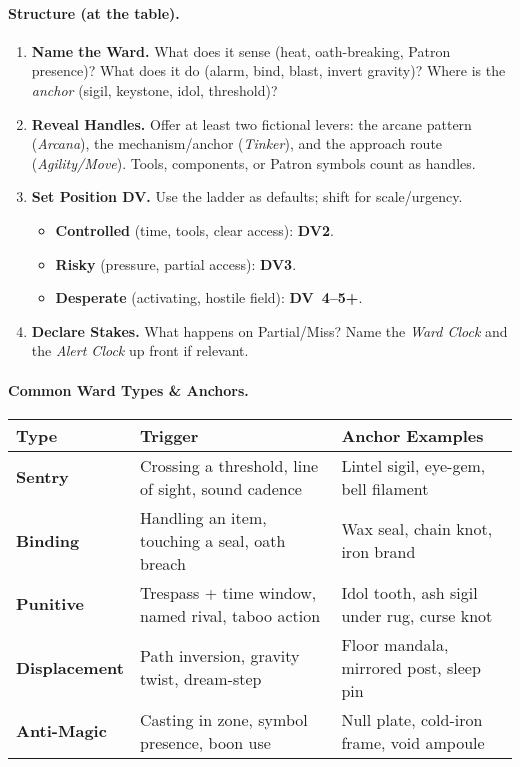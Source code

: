 \paragraph{Structure (at the table).}
\begin{enumerate}[label=\textbf{Step~\arabic*:}, leftmargin=2.1em]
\item \textbf{Name the Ward.} What does it sense (heat, oath-breaking, Patron presence)? What does it do (alarm, bind, blast, invert gravity)? Where is the \emph{anchor} (sigil, keystone, idol, threshold)?
\item \textbf{Reveal Handles.} Offer at least two fictional levers: the arcane pattern (\emph{Arcana}), the mechanism/anchor (\emph{Tinker}), and the approach route (\emph{Agility/Move}). Tools, components, or Patron symbols count as handles.
\item \textbf{Set Position \textrightarrow{} DV.} Use the ladder as defaults; shift for scale/urgency.
\begin{itemize}
\item \textbf{Controlled} (time, tools, clear access): \textbf{DV2}.
\item \textbf{Risky} (pressure, partial access): \textbf{DV3}.
\item \textbf{Desperate} (activating, hostile field): \textbf{DV~4–5+}.
\end{itemize}
\item \textbf{Declare Stakes.} What happens on Partial/Miss? Name the \emph{Ward Clock} and the \emph{Alert Clock} up front if relevant.
\end{enumerate}

\paragraph{Common Ward Types & Anchors.}
\begin{tabularx}{\linewidth}{>{\bfseries}l >{\raggedright\arraybackslash}X >{\raggedright\arraybackslash}X}
\toprule
Type & Trigger & Anchor Examples \\
\midrule
Sentry & Crossing a threshold, line of sight, sound cadence & Lintel sigil, eye-gem, bell filament \\
Binding & Handling an item, touching a seal, oath breach & Wax seal, chain knot, iron brand \\
Punitive & Trespass + time window, named rival, taboo action & Idol tooth, ash sigil under rug, curse knot \\
Displacement & Path inversion, gravity twist, dream-step & Floor mandala, mirrored post, sleep pin \\
Anti-Magic & Casting in zone, symbol presence, boon use & Null plate, cold-iron frame, void ampoule \\
\bottomrule
\end{tabularx}

